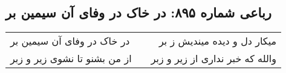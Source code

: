 \begin{center}
\section*{رباعی شماره ۸۹۵: در خاک در وفای آن سیمین بر}
\label{sec:0895}
\begin{longtable}{l p{0.5cm} r}
در خاک در وفای آن سیمین بر
&&
میکار دل و دیده میندیش ز بر
\\
از من بشنو تا نشوی زیر و زبر
&&
والله که خبر نداری از زیر و زبر
\\
\end{longtable}
\end{center}
